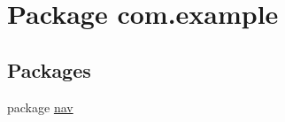 \hypertarget{namespacecom_1_1example}{}\section{Package com.\+example}
\label{namespacecom_1_1example}
\subsection*{Packages}
\begin{DoxyCompactItemize}
\item 
package \hyperlink{namespacecom_1_1example_1_1nav}{nav}
\end{DoxyCompactItemize}

